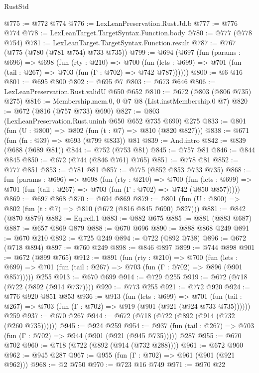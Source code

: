 \begin{lexlean}{RustStd}
\begin{coremodule}
{\begin{coremodule}
{{{{{{{@775 := @772 @774
@776 := LexLeanPreservation.Rust.Jd.b
@777 := @776 @774
@778 := LexLeanTarget.TargetSyntax.Function.body
@780 := @777 (@778 @754)
@781 := LexLeanTarget.TargetSyntax.Function.result
@787 := @767 (@775 (@780 (@781 @754) @733 @735))
@799 := @694
    (@697
      (fun (params : @696) =>
      @698
        (fun (rty : @210) =>
        @700
          (fun (lets : @699) => @701 (fun (tail : @267) => @703 (fun (Γ : @702) => @742 @787))))))
@800 := @6 @16
@801 := @695 @800
@802 := @695 @7
@803 := @673 @646
@806 := LexLeanPreservation.Rust.validU @650 @652
@810 := @672 (@803 (@806 @735) @275)
@816 := Membership.mem.{0, 0} @7 @8 (List.instMembership.{0} @7)
@820 := @672 (@816 (@757 @733) @690)
@827 := @803 (LexLeanPreservation.Rust.uninh @650 @652 @735 @690) @275
@833 := @801 (fun (U : @800) => @802 (fun (t : @7) => @810 (@820 @827)))
@838 := @671 (fun (fn : @39) => @693 (@799 @833)) @81
@839 := And.intro
@842 := @839 (@688 (@689 @81))
@844 := @752 (@753 @81)
@845 := @757 @81
@846 := @844 @845
@850 := @672 (@744 (@846 @761) @765)
@851 := @778 @81
@852 := @777 @851
@853 := @781 @81
@857 := @775 (@852 @853 @733 @735)
@868 := fun (params : @696) =>
  @698
    (fun (rty : @210) =>
    @700
      (fun (lets : @699) => @701 (fun (tail : @267) => @703 (fun (Γ : @702) => @742 (@850 @857)))))
@869 := @697 @868
@870 := @694 @869
@879 := @801 (fun (U : @800) => @802 (fun (t : @7) => @810 (@672 (@816 @845 @690) @827)))
@881 := @842 (@870 @879)
@882 := Eq.refl.{1}
@883 := @882 @675
@885 := @881 (@883 @687)
@887 := @657 @869 @879
@888 := @670 @696
@890 := @888 @868 @249
@891 := @670 @210
@892 := @725 @249
@894 := @722 (@892 @738)
@896 := @672 (@718 @894)
@897 := @760 @249
@898 := @846 @897
@899 := @744 @898
@901 := @672 (@899 @765)
@912 := @891
    (fun (rty : @210) =>
    @700
      (fun (lets : @699) => @701 (fun (tail : @267) => @703 (fun (Γ : @702) => @896 (@901 @857)))))
    @255
@913 := @670 @699
@914 := @729 @255
@919 := @672 (@718 (@722 (@892 (@914 @737))))
@920 := @773 @255
@921 := @772 @920
@924 := @776 @920 @851 @853
@936 := @913
    (fun (lets : @699) =>
    @701 (fun (tail : @267) => @703 (fun (Γ : @702) => @919 (@901 (@921 (@924 @733 @735))))))
    @259
@937 := @670 @267
@944 := @672 (@718 (@722 (@892 (@914 (@732 (@260 @735))))))
@945 := @924 @259
@954 := @937 (fun (tail : @267) => @703 (fun (Γ : @702) => @944 (@901 (@921 (@945 @735))))) @287
@955 := @670 @702
@960 := @718 (@722 (@892 (@914 (@732 @288))))
@961 := @672 @960
@962 := @945 @287
@967 := @955 (fun (Γ : @702) => @961 (@901 (@921 @962)))
@968 := @2 @750
@970 := @723 @16 @749
@971 := @970 @22
}}}}}}}
\end{coremodule}}
\end{coremodule}
\end{lexlean}
